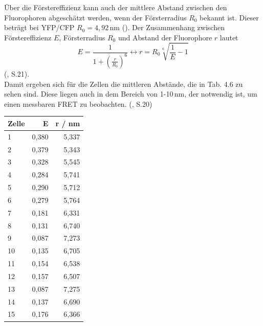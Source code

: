 Über die Förstereffizienz kann auch der mittlere Abstand zwischen den Fluorophoren abgeschätzt werden, wenn der Försterradius $R_0$ bekannt ist. 
Dieser beträgt bei YFP/CFP $R_0 = 4,92$\,nm (\cite{Patterson2000}). Der Zusammenhang zwischen Förstereffizienz $E$, Försterradius $R_0$ und Abstand der Fluorophore $r$ 
lautet 
\begin{equation*}
    E = \frac{1}{1+(\frac{r}{R_0})^6} \leftrightarrow r = R_0 \sqrt[6]{\frac{1}{E} -1} 
\end{equation*}
(\cite{Zuern2009}, S.21).\\
Damit ergeben sich für die Zellen die mittleren Abstände, die in Tab. 4.6 zu sehen sind. Diese liegen auch in dem Bereich von 
1-10\,nm, der notwendig ist, um einen messbaren FRET zu beobachten. (\cite{Zuern2009}, S.20)

\begin{center}
    \centering
    \begin{tabular}{lrr}
        \toprule
        Zelle &     E &     r / nm \\
        \midrule
        1     & 0,380 & 5,337 \\
        2     & 0,379 & 5,343 \\
        3     & 0,328 & 5,545 \\
        4     & 0,284 & 5,741 \\
        5     & 0,290 & 5,712 \\
        6     & 0,279 & 5,764 \\
        7     & 0,181 & 6,331 \\
        8     & 0,131 & 6,740 \\
        9     & 0,087 & 7,273 \\
        10    & 0,135 & 6,705 \\
        11    & 0,154 & 6,538 \\
        12    & 0,157 & 6,507 \\
        13    & 0,087 & 7,275 \\
        14    & 0,137 & 6,690 \\
        15    & 0,176 & 6,366 \\
        \bottomrule
    \end{tabular}
\end{center}



